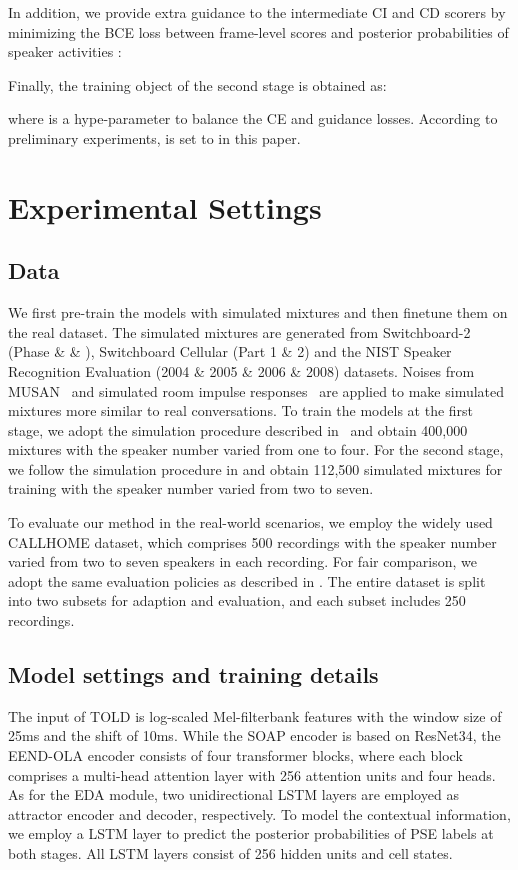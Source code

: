\documentclass{article}
\begin{document}
In addition, we provide extra guidance to the intermediate CI and CD scorers by minimizing the BCE loss between frame-level scores  and posterior probabilities of speaker activities :

Finally, the training object of the second stage is obtained as:

where  is a hype-parameter to balance the CE and guidance losses. According to preliminary experiments,  is set to  in this paper.






\section{Experimental Settings}
\subsection{Data}
We first pre-train the models with simulated mixtures and then finetune them on the real dataset.
The simulated mixtures are generated from Switchboard-2 (Phase \uppercase\expandafter{} \& \uppercase\expandafter{} \& \uppercase\expandafter{}), Switchboard Cellular (Part 1 \& 2) and the NIST Speaker Recognition Evaluation (2004 \& 2005 \& 2006 \& 2008) datasets. Noises from MUSAN~\cite{musan} and simulated room impulse responses~\cite{rirs} are applied to make simulated mixtures more similar to real conversations. To train the models at the first stage, we adopt the simulation procedure described in~\cite{SA_EEND} and obtain 400,000 mixtures with the speaker number varied from one to four.
For the second stage, we follow the simulation procedure in \cite{EAND} and obtain 112,500 simulated mixtures for training with the speaker number varied from two to seven.

To evaluate our method in the real-world scenarios, we employ the widely used CALLHOME dataset, which comprises 500 recordings with the speaker number varied from two to seven speakers in each recording. For fair comparison, we adopt the same evaluation policies as described in \cite{EEND_EDA}. The entire dataset is split into two subsets for adaption and evaluation, and each subset includes 250 recordings.

\subsection{Model settings and training details}
\label{subsec:setting}
The input of TOLD is log-scaled Mel-filterbank features with the window size of 25ms and the shift of 10ms. While the SOAP encoder is based on ResNet34, the EEND-OLA encoder consists of four transformer blocks, where each block comprises a multi-head attention layer with 256 attention units and four heads. As for the EDA module, two unidirectional LSTM layers are employed as attractor encoder and decoder, respectively. To model the contextual information, we employ a LSTM layer to predict the posterior probabilities of PSE labels at both stages. All LSTM layers consist of 256 hidden units and cell states.
\end{document}
